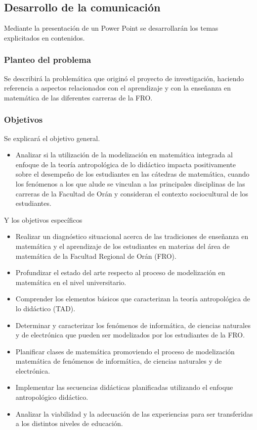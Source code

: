 \subsection{Desarrollo de la comunicación}

Mediante la presentación de un Power Point se desarrollarán los temas explicitados en contenidos.

\subsubsection{Planteo del problema}

Se describirá la problemática que originó el proyecto de investigación, haciendo referencia a aspectos relacionados con el aprendizaje y con
la enseñanza en matemática de las diferentes carreras de la FRO.

\subsubsection{Objetivos}

Se explicará el objetivo general.

\begin{itemize}
	\item Analizar si la utilización de la modelización en matemática integrada al enfoque de la teoría antropológica de lo didáctico impacta positivamente sobre el desempeño de los estudiantes en las cátedras de matemática, cuando los fenómenos a los que alude se vinculan a las principales disciplinas de las carreras de la Facultad de Orán y consideran el contexto sociocultural de los estudiantes.
\end{itemize}

Y los objetivos específicos

\begin{itemize}
	\item Realizar un diagnóstico situacional acerca de las tradiciones de enseñanza en matemática y el aprendizaje de los estudiantes en materias del área de matemática de la Facultad Regional de Orán (FRO).
	\item Profundizar el estado del arte respecto al proceso de modelización en matemática en el nivel universitario.
	\item Comprender los elementos básicos que caracterizan la teoría antropológica de lo didáctico (TAD).
	\item Determinar y caracterizar los fenómenos de informática, de ciencias naturales y de electrónica que pueden ser modelizados por los estudiantes de la FRO.
	\item Planificar clases de matemática promoviendo el proceso de modelización matemática de fenómenos de informática, de ciencias naturales y de electrónica.
	\item Implementar las secuencias didácticas planificadas utilizando el enfoque antropológico didáctico.
	\item Analizar la viabilidad y la adecuación de las experiencias para ser transferidas a los distintos niveles de educación.
\end{itemize}


